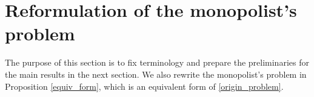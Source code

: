 





\bigskip



\section{Reformulation of the monopolist's problem}\label{section:preliminary}


The purpose of this section is to fix terminology and prepare the preliminaries for the main results in the next section. We also rewrite the monopolist's problem in Proposition \ref{equiv_form}, which is an equivalent form of \eqref{origin_problem}. \medskip


